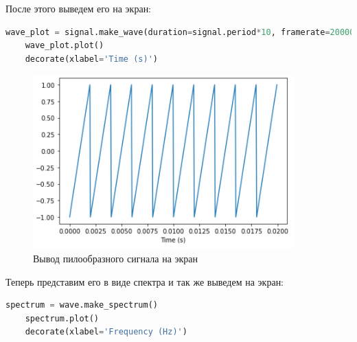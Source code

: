 \documentclass[a4paper]{article}
\begin{document}
            После этого выведем его на экран:
            
\begin{lstlisting}[language=Python, caption= Вывод пилообразного сигнала на экран]
    wave_plot = signal.make_wave(duration=signal.period*10, framerate=20000)
    wave_plot.plot()
    decorate(xlabel='Time (s)')
\end{lstlisting}               
            
            \begin{figure}[H]
                \centering
                \includegraphics[width=\textwidth]{ex_6_sawtooth_signal_plot.png}
                \caption{Вывод пилообразного сигнала на экран}
                \label{fig:ex_6_sawtooth_signal_plot}
            \end{figure}
            
            Теперь представим его в виде спектра и так же выведем на экран:
            
\begin{lstlisting}[language=Python, caption= Вывод спектра на экран]
    spectrum = wave.make_spectrum()
    spectrum.plot()
    decorate(xlabel='Frequency (Hz)')
\end{lstlisting}               
            
\end{document}
